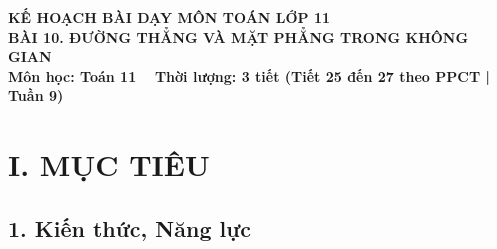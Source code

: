 \documentclass[12pt, a4paper]{article}
\begin{document}
\begin{center}
    {\fontsize{14pt}{17pt}\selectfont \textbf{KẾ HOẠCH BÀI DẠY MÔN TOÁN LỚP 11}}\\[6pt]
    {\fontsize{16pt}{19pt}\selectfont \textbf{BÀI 10. ĐƯỜNG THẲNG VÀ MẶT PHẲNG TRONG KHÔNG GIAN}}\\[4pt]
    {\fontsize{12pt}{15pt}\selectfont \textbf{Môn học: Toán 11} \ \textbar \ \textbf{Thời lượng: 3 tiết (Tiết 25 đến 27 theo PPCT | Tuần 9)}}
\end{center}

\vspace{5pt}

\section*{I. MỤC TIÊU}

\subsection*{1. Kiến thức, Năng lực}
\end{document}
